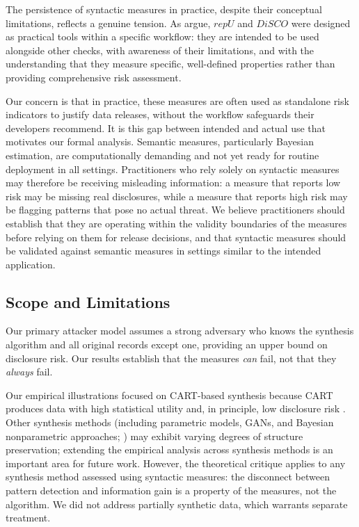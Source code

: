 \documentclass[Afour,sageh,times,doublespace]{sagej}
\begin{document}
The persistence of syntactic measures in practice, despite their conceptual limitations, reflects a genuine tension. As \citet{raab2026} argue, $repU$ and $DiSCO$ were designed as practical tools within a specific workflow: they are intended to be used alongside other checks, with awareness of their limitations, and with the understanding that they measure specific, well-defined properties rather than providing comprehensive risk assessment. 

Our concern is that in practice, these measures are often used as standalone risk indicators to justify data releases, without the workflow safeguards their developers recommend. It is this gap between intended and actual use that motivates our formal analysis. Semantic measures, particularly Bayesian estimation, are computationally demanding and not yet ready for routine deployment in all settings. Practitioners who rely solely on syntactic measures may therefore be receiving misleading information: a measure that reports low risk may be missing real disclosures, while a measure that reports high risk may be flagging patterns that pose no actual threat. We believe practitioners should establish that they are operating within the validity boundaries of the measures before relying on them for release decisions, and that syntactic measures should be validated against semantic measures in settings similar to the intended application.

\subsection{Scope and Limitations}

Our primary attacker model assumes a strong adversary who knows the synthesis algorithm and all original records except one, providing an upper bound on disclosure risk. Our results establish that the measures \textit{can} fail, not that they \textit{always} fail.

Our empirical illustrations focused on CART-based synthesis because CART produces data with high statistical utility and, in principle, low disclosure risk \citep{Little2025, Dankar2021}. Other synthesis methods (including parametric models, GANs, and Bayesian nonparametric approaches; \citep{ManriqueVallier2018}) may exhibit varying degrees of structure preservation; extending the empirical analysis across synthesis methods is an important area for future work. However, the theoretical critique applies to any synthesis method assessed using syntactic measures: the disconnect between pattern detection and information gain is a property of the measures, not the algorithm. We did not address partially synthetic data, which warrants separate treatment.
\end{document}
